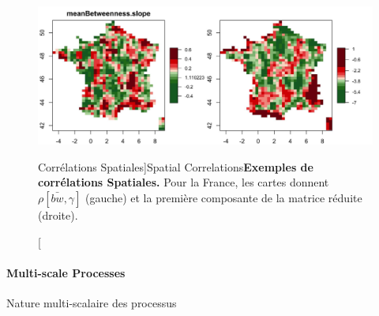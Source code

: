 \begin{figure}[h!]
\includegraphics[width=\linewidth]{Figures/Final/4-1-3-fig-staticcorrs-mapscorrs}
\caption[Spatial Correlations][Corrélations Spatiales]{Spatial Correlations\label{fig:staticcorrs:mapscorrs}}{\textbf{Exemples de corrélations Spatiales.} Pour la France, les cartes donnent $\rho\left[\bar{bw},\gamma\right]$ (gauche) et la première composante de la matrice réduite (droite).\label{fig:staticcorrs:mapscorrs}}
\end{figure}



\paragraph{Multi-scale Processes}{Nature multi-scalaire des processus}

